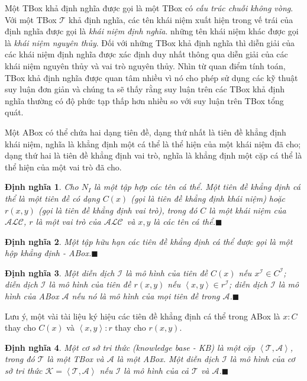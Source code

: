 \documentclass[12pt,a4paper]{report}
\newtheorem{Definition}{Định nghĩa}[chapter]
\newcommand{\myend}{\mbox{}\hfill\mbox{{\scriptsize$\!\blacksquare$}}}
\newcommand{\ALC}{$\mathcal{ALC}$}
\newcommand{\mT}{\mathcal{T}}
\newcommand{\mA}{\mathcal{A}}
\newcommand{\mI}{\mathcal{I}}
\def\tuple#1{\left\langle#1\right\rangle}
\begin{document}
Một TBox khả định nghĩa được gọi là một TBox có \textit{cấu trúc chuỗi không vòng}. Với một TBox $\mT$ khả định nghĩa, các tên khái niệm xuất hiện trong vế trái của định nghĩa được gọi là \textit{khái niệm định nghĩa}. những tên khái niệm khác được gọi là \textit{khái niệm nguyên thủy}. Đối với những TBox khả định nghĩa thì diễn giải của các khái niệm định nghĩa được xác định duy nhất thông qua diễn giải của các khái niệm nguyên thủy và vai trò nguyên thủy. Nhìn từ quan điểm tính toán, TBox khả định nghĩa được quan tâm nhiều vì nó cho phép sử dụng các kỹ thuật suy luận đơn giản \cite{ref:Baader00} và chúng ta sẽ thấy rằng suy luận trên các TBox khả định nghĩa thường có độ phức tạp thấp hơn nhiều so với suy luận trên TBox tổng quát.

Một ABox có thể chứa hai dạng tiên đề, dạng thứ nhất là tiên đề khẳng định khái niệm, nghĩa là khẳng định một cá thể là thể hiện của một khái niệm đã cho; dạng thứ hai là tiên đề khẳng định vai trò, nghĩa là khẳng định một cặp cá thể là thể hiện của một vai trò đã cho.

\begin{Definition}\label{def:Assertion}
Cho $N_I$ là một tập hợp các tên cá thể. Một \textnormal{tiên đề khẳng định cá thể} là một tiên đề có dạng $C(x)$ (gọi là \textnormal{tiên đề khẳng định khái niệm}) hoặc $r(x, y)$ (gọi là \textnormal{tiên đề khẳng định vai trò}), trong đó $C$ là một khái niệm của \ALC, $r$ là một vai trò của \ALC\ và $x, y$ là các tên cá thể.\myend
\end{Definition}

\begin{Definition}\label{def:ABox}
Một tập hữu hạn các tiên đề khẳng định cá thể được gọi là một \textnormal{hộp khẳng định - ABox}.\myend
\end{Definition}

\begin{Definition}\label{def:ModelABox}
Một diễn dịch $\mI$ là mô hình của tiên đề $C(x)$ nếu $x^\mI \in C^\mI$; diễn dịch $\mI$ là mô hình của tiên đề $r(x, y)$ nếu $\tuple{x, y} \in r^\mI$; diễn dịch $\mI$ là mô hình của ABox $\mA$ nếu nó là mô hình của mọi tiên đề trong $\mA$.\myend
\end{Definition}

Lưu ý, một vài tài liệu ký hiệu các tiên đề khẳng định cá thể trong ABox là $x:C$ thay cho $C(x)$ và $\tuple{x, y}:r$ thay cho $r(x, y)$.

\begin{Definition}\label{def:KB}
Một \textnormal{cơ sở tri thức} (knowledge base - KB) là một cặp $\tuple{\mathcal{T, A}}$, trong đó $\mT$ là một TBox và $\mA$ là một ABox. Một diễn dịch $\mI$ là mô hình của cơ sở tri thức $\mathcal{K=\tuple{T,A}}$ nếu $\mI$ là mô hình của cả $\mT$ và $\mA$.\myend
\end{Definition}
\end{document}
